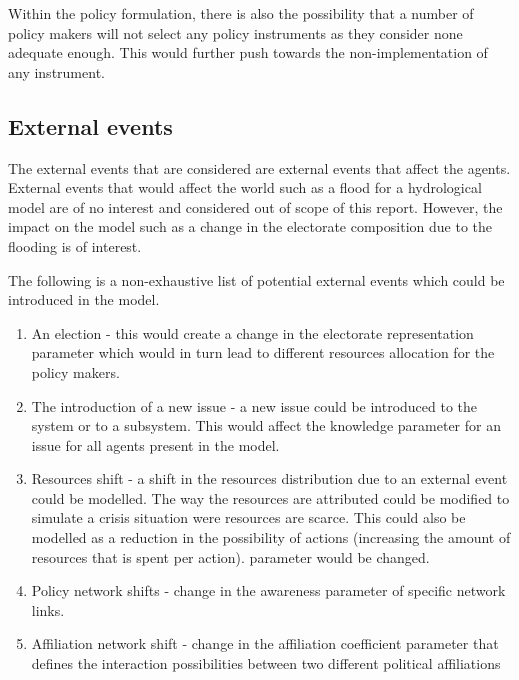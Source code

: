 \documentclass[11pt]{article}
\begin{document}
Within the policy formulation, there is also the possibility that a number of policy makers will not select any policy instruments as they consider none adequate enough. This would further push towards the non-implementation of any instrument.


\subsection{External events}
\label{sec:externalEvents}

The external events that are considered are external events that affect the agents. External events that would affect the world such as a flood for a hydrological model are of no interest and considered out of scope of this report. However, the impact on the model such as a change in the electorate composition due to the flooding is of interest.

The following is a non-exhaustive list of potential external events which could be introduced in the model.

\begin{enumerate}
\item An election - this would create a change in the electorate representation parameter which would in turn lead to different resources allocation for the policy makers.
\item The introduction of a new issue - a new issue could be introduced to the system or to a subsystem. This would affect the knowledge parameter for an issue for all agents present in the model.
\item Resources shift - a shift in the resources distribution due to an external event could be modelled. The way the resources are attributed could be modified to simulate a crisis situation were resources are scarce. This could also be modelled as a reduction in the possibility of actions (increasing the amount of resources that is spent per action).
parameter would be changed.
\item Policy network shifts - change in the awareness parameter of specific network links.
\item Affiliation network shift - change in the affiliation coefficient parameter that defines the interaction possibilities between two different political affiliations
\end{enumerate}





\end{document}
